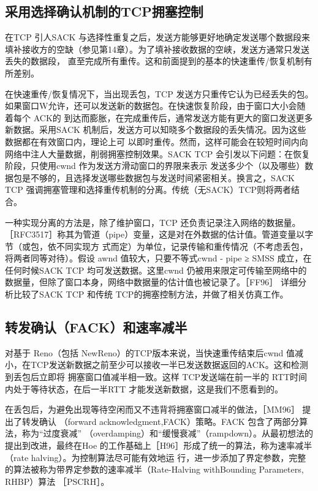 \subsection{采用选择确认机制的TCP拥塞控制}
在TCP 引人SACK 与选择性重复之后，发送方能够更好地确定发送哪个数据段来填补接收方的空缺（参见第14章）。为了填补接收数据的空峡，发送方通常只发送丢失的数据段，
直至完成所有重传。这和前面提到的基本的快速重传/恢复机制有所差别。

在快速重传/恢复情况下，当出现丢包，TCP 发送方只重传它认为已经丢失的包。如果窗口W允许，还可以发送新的数据包。在快速恢复阶段，由于窗口大小会随着每个 ACK的
到达而膨胀，在完成重传后，通常发送方能有更大的窗口发送更多新数据。采用SACK 机制后，发送方可以知晓多个数据段的丢失情况。因为这些数据都在有效窗口内，理论上可
以即时重传。然而，这样可能会在较短时间内向网络中注人大量数据，削弱拥塞控制效果。SACK TCP 会引发以下问题：在恢复阶段，只使用cwnd 作为发送方滑动窗口的界限来表示
发送多少个（以及哪些）数据包是不够的，且选择发送哪些数据包与发送时间紧密相关。换言之，SACK TCP 强调拥塞管理和选择重传机制的分离。传统（无SACK）TCP则将两者结合。

一种实现分离的方法是，除了维护窗口，TCP 还负责记录注入网络的数据量。［RFC3517］称其为管道（pipe）变量，这是对在外数据的估计值。管道变量以字节（或包，依不同实现方
式而定）为单位，记录传输和重传情况（不考虑丢包，将两者同等对待）。假设 awnd 值较大，只要不等式cwnd - pipe ≥ SMSS 成立，在任何时候SACK TCP 均可发送数据。这里cwnd
仍被用来限定可传输至网络中的数据量，但除了窗口本身，网络中数据量的估计值也被记录了。［FF96］ 详细分析比较了SACK TCP 和传统 TCP的拥塞控制方法，并做了相关仿真工作。

\subsection{转发确认（FACK）和速率减半}
对基于 Reno（包括 NewReno）的TCP版本来说，当快速重传结束后cwnd 值减小，在TCP发送新数据之前至少可以接收一半已发送数据返回的ACK。这和检测到丢包后立即将
拥塞窗口值减半相一致。这样 TCP发送端在前一半的 RTT时间内处于等待状态，在后一半RTT 才能发送新数据，这是我们不愿看到的。

在丢包后，为避免出现等待空闲而又不违背将拥塞窗口减半的做法，［MM96］ 提出了转发确认 （forward acknowledgment,FACK）策略。FACK 包含了两部分算法，称为“过度衰减”
（overdamping）和“缓慢衰减”（rampdown）。从最初想法的提出到改进，最终在Hoe 的工作基础上［H96］形成了统一的算法，称为速率减半（rate halving）。为控制算法尽可能有效地运
行，进一步添加了界定参数，完整的算法被称为带界定参数的速率减半（Rate-Halving withBounding Parameters, RHBP）算法 ［PSCRH］。

